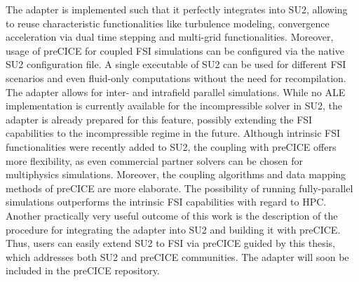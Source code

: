 The adapter is implemented such that it perfectly integrates into SU2, allowing to reuse characteristic
functionalities like turbulence modeling, convergence acceleration via dual time stepping and multi-grid
functionalities. Moreover, usage of preCICE for coupled FSI simulations can be configured via the native
SU2 configuration file. A single executable of SU2 can be used for different FSI scenarios and even
fluid-only computations without the need for recompilation. The adapter allows for inter- and intrafield
parallel simulations. While no ALE implementation is currently available for the incompressible solver
in SU2, the adapter is already prepared for this feature, possibly extending the FSI capabilities to the
incompressible regime in the future.
Although intrinsic FSI functionalities were recently added to SU2, the coupling with preCICE offers more
flexibility, as even commercial partner solvers can be chosen for multiphysics simulations. Moreover, the
coupling algorithms and data mapping methods of preCICE are more elaborate. The possibility of
running fully-parallel simulations outperforms the intrinsic FSI capabilities with regard to HPC.
Another practically very useful outcome of this work is the description of the procedure for integrating the
adapter into SU2 and building it with preCICE. Thus, users can easily extend SU2 to FSI via preCICE
guided by this thesis, which addresses both SU2 and preCICE communities. The adapter will soon be
included in the preCICE repository.